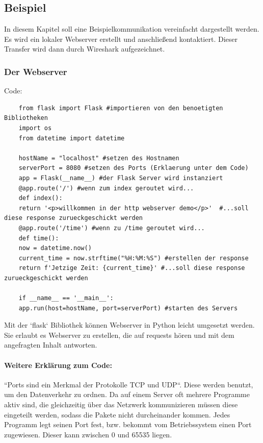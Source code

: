 \documentclass[12pt]{article}
\begin{document}
\subsection{Beispiel}
In diesem Kapitel soll eine Beispielkommunikation vereinfacht dargestellt werden. Es wird ein lokaler Webserver erstellt und anschließend kontaktiert. Dieser Transfer wird dann durch Wireshark aufgezeichnet.

\subsubsection{Der Webserver}
Code: 

\begin{lstlisting}
	from flask import Flask #importieren von den benoetigten Bibliotheken
	import os
	from datetime import datetime
	
	hostName = "localhost" #setzen des Hostnamen
	serverPort = 8080 #setzen des Ports (Erklaerung unter dem Code)
	app = Flask(__name__) #der Flask Server wird instanziert
	@app.route('/') #wenn zum index geroutet wird...
	def index():
	return '<p>willkommen in der http webserver demo</p>'  #...soll diese response zurueckgeschickt werden
	@app.route('/time') #wenn zu /time geroutet wird...
	def time():
	now = datetime.now()
	current_time = now.strftime("%H:%M:%S") #erstellen der response
	return f'Jetzige Zeit: {current_time}' #...soll diese response zurueckgeschickt werden
	
	if __name__ == '__main__':
	app.run(host=hostName, port=serverPort) #starten des Servers
\end{lstlisting}

Mit der `flask` Bibliothek können Webserver in Python leicht umgesetzt werden. Sie erlaubt es Webserver zu erstellen, die auf requests hören und mit dem angefragten Inhalt antworten.\cite{flask}

\paragraph{Weitere Erklärung zum Code:}
``Ports sind ein Merkmal der Protokolle TCP und UDP``\cite{ports19}. Diese werden benutzt, um den Datenverkehr zu ordnen. Da auf einem Server oft mehrere Programme aktiv sind, die gleichzeitig über das Netzwerk kommunizieren müssen diese eingeteilt werden, sodass die Pakete nicht durcheinander kommen. Jedes Programm legt seinen Port fest, bzw. bekommt vom Betriebssystem einen Port zugewiesen. Dieser kann zwischen 0 und 65535 liegen.\cite{ports}
\end{document}
